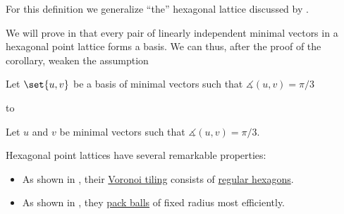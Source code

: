 \begin{comments}
  \item For this definition we generalize \enquote{the} hexagonal lattice discussed by .

  \item We will prove in  that every pair of linearly independent minimal vectors in a hexagonal point lattice forms a basis. We can thus, after the proof of the corollary, weaken the assumption
  \begin{displayquote}
    Let \( \set{ u, v } \) be a basis of minimal vectors such that \( \measuredangle(u, v) = \pi / 3 \)
  \end{displayquote}
  to
  \begin{displayquote}
    Let \( u \) and \( v \) be minimal vectors such that \( \measuredangle(u, v) = \pi / 3 \).
  \end{displayquote}

  \item Hexagonal point lattices have several remarkable properties:
  \begin{itemize}
    \item As shown in , their \hyperref[def:voronoi_tiling]{Voronoi tiling} consists of \hyperref[def:regular_polygon]{regular hexagons}.
    \item As shown in , they \hyperref[def:lattice_ball_packing]{pack balls} of fixed radius most efficiently.
  \end{itemize}
\end{comments}

